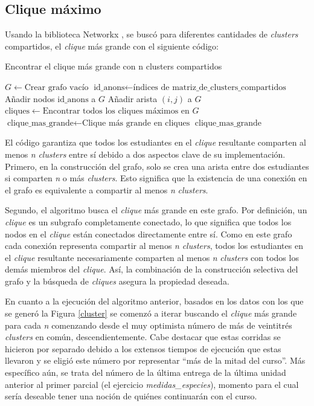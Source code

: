 \documentclass[11pt,a4paper,twoside,openany]{tesis}
\begin{document}
\subsection{Clique máximo}\textbf{ }
Usando la biblioteca Networkx \cite{networkx}, se buscó para diferentes cantidades de \emph{clusters} compartidos, el \emph{clique} más grande con el siguiente código:


\begin{algorithm}[H]
\caption{Encontrar el clique más grande con n clusters compartidos}
\begin{algorithmic}[1]
    \State $G \gets \text{Crear grafo vacío}$
    \State $\text{id\_anons} \gets \text{índices de matriz\_de\_clusters\_compartidos}$
    \State Añadir nodos $\text{id\_anons}$ a $G$
            \State Añadir arista $(i, j)$ a $G$
        \EndIf
    \EndFor
    \State $\text{cliques} \gets \text{Encontrar todos los cliques máximos en } G$
    \State $\text{clique\_mas\_grande} \gets \text{Clique más grande en cliques}$
    \State \Return $\text{clique\_mas\_grande}$
\EndFunction
\end{algorithmic}
\end{algorithm}

El código garantiza que todos los estudiantes en el \emph{clique} resultante comparten al menos \emph{n} \emph{clusters} entre sí debido a dos aspectos clave de su implementación. Primero, en la construcción del grafo, solo se crea una arista entre dos estudiantes si comparten \emph{n} o más \emph{clusters}. Esto significa que la existencia de una conexión en el grafo es equivalente a compartir al menos \emph{n} \emph{clusters}.

Segundo, el algoritmo busca el \emph{clique} más grande en este grafo. Por definición, un \emph{clique} es un subgrafo completamente conectado, lo que significa que todos los nodos en el \emph{clique} están conectados directamente entre sí. Como en este grafo cada conexión representa compartir al menos \emph{n} \emph{clusters}, todos los estudiantes en el \emph{clique} resultante necesariamente comparten al menos \emph{n} \emph{clusters} con todos los demás miembros del \emph{clique}. Así, la combinación de la construcción selectiva del grafo y la búsqueda de \emph{cliques} asegura la propiedad deseada.

En cuanto a la ejecución del algoritmo anterior, basados en los datos con los que se generó la Figura \ref{cluster} se comenzó a iterar buscando el \emph{clique} más grande para cada \emph{n} comenzando desde el muy optimista número de más de veintitrés \emph{clusters} en común, descendientemente. Cabe destacar que estas corridas se hicieron por separado debido a los extensos tiempos de ejecución que estas llevaron y se eligió este número por representar ``más de la mitad del curso''. Más específico aún, se trata del número de la última entrega de la última unidad anterior al primer parcial (el ejercicio \emph{medidas\_especies}), momento para el cual sería deseable tener una noción de quiénes continuarán con el curso.   
\end{document}
